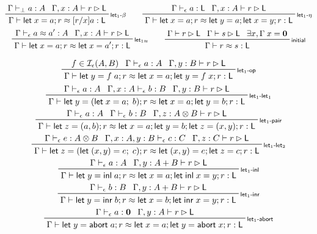 \documentclass[acmsmall,screen,review]{acmart}
\newcommand{\mc}[1]{\ensuremath{\mathcal{#1}}}
\newcommand{\mb}[1]{\ensuremath{\mathbf{#1}}}
\newcommand{\ms}[1]{\ensuremath{\mathsf{#1}}}
\newcommand{\linl}[1]{\ms{inl}\;{#1}}
\newcommand{\linr}[1]{\ms{inr}\;{#1}}
\newcommand{\labort}[1]{\ms{abort}\;{#1}}
\newcommand{\letexpr}[3]{\ensuremath{\ms{let}\;#1 = #2;\;#3}}
\newcommand{\letstmt}[3]{\ensuremath{\ms{let}\;#1 = #2; #3}}
\newcommand{\bhyp}[2]{#1 : #2}
\newcommand{\rle}[1]{{\scriptsize\textsf{#1}}}
\newcommand{\hasty}[4]{#1 \vdash_{#2} #3: {#4}}
\newcommand{\haslb}[3]{#1 \vdash #2 \rhd #3}
\newcommand{\isop}[4]{#1 \in \mc{I}_{#4}(#2, #3)}
\newcommand{\teqv}{\approx}
\newcommand{\tmeq}[5]{#1 \vdash_{#2} #3 \teqv #4 : {#5}}
\newcommand{\lbeq}[4]{#1 \vdash #2 \teqv #3 : {#4}}
\begin{document}
\begin{gather*}
  \prftree[r]{\rle{let$_1$-$\beta$}}
    {\hasty{\Gamma}{\bot}{a}{A}}
    {\haslb{\Gamma, \bhyp{x}{A}}{r}{\ms{L}}}
    {\lbeq{\Gamma}{\letstmt{x}{a}{r}}{[r/x]a}{\ms{L}}}
  \qquad
  \prftree[r]{\rle{let$_1$-$\eta$}}
    {\hasty{\Gamma}{\epsilon}{a}{\ms{L}}}
    {\haslb{\Gamma, \bhyp{x}{A}}{r}{\ms{L}}}
    {\lbeq{\Gamma}{\letstmt{x}{a}{r}}{\letstmt{y}{a}{\letstmt{x}{y}{r}}}{\ms{L}}}
  \\
  \prftree[r]{\rle{let$_{1\approx}$}}
    {\tmeq{\Gamma}{\epsilon}{a}{a'}{A}}
    {\haslb{\Gamma, \bhyp{x}{A}}{r}{\ms{L}}}
    {\lbeq{\Gamma}{\letstmt{x}{a}{r}}{\letstmt{x}{a'}{r}}{\ms{L}}}
  \qquad
  \prftree[r]{\rle{initial}}
    {\haslb{\Gamma}{r}{\ms{L}}}
    {\haslb{\Gamma}{s}{\ms{L}}}
    {\exists x, \Gamma\;x = \mb{0}}
    {\lbeq{\Gamma}{r}{s}{\ms{L}}}
\end{gather*}

\begin{gather*}
  \prftree[r]{\rle{let$_1$-op}}
    {\isop{f}{A}{B}{\epsilon}}
    {\hasty{\Gamma}{\epsilon}{a}{A}}
    {\haslb{\Gamma, \bhyp{y}{B}}{r}{\ms{L}}}
    {\lbeq{\Gamma}{\letstmt{y}{f\;a}{r}}{\letstmt{x}{a}{\letstmt{y}{f\;x}{r}}}{\ms{L}}}
  \\
  \prftree[r]{\rle{let$_{1}$-let$_1$}}
    {\hasty{\Gamma}{\epsilon}{a}{A}}
    {\hasty{\Gamma, \bhyp{x}{A}}{\epsilon}{b}{B}}
    {\haslb{\Gamma, \bhyp{y}{B}}{r}{\ms{L}}}
    {\lbeq{\Gamma}{\letstmt{y}{(\letexpr{x}{a}{b})}{r}}{\letstmt{x}{a}{\letstmt{y}{b}{r}}}{\ms{L}}}
  \\
  \prftree[r]{\rle{let$_1$-pair}}
    {\hasty{\Gamma}{\epsilon}{a}{A}}
    {\hasty{\Gamma}{\epsilon}{b}{B}}
    {\haslb{\Gamma, \bhyp{z}{A \otimes B}}{r}{\ms{L}}}
    {\lbeq{\Gamma}
      {\letstmt{z}{(a, b)}{r}}
      {\letstmt{x}{a}{\letstmt{y}{b}{\letstmt{z}{(x, y)}{r}}}}
      {\ms{L}}}
  \\
  \prftree[r]{\rle{let$_{1}$-let$_2$}}
    {\hasty{\Gamma}{\epsilon}{e}{A \otimes B}}
    {\hasty{\Gamma, \bhyp{x}{A}, \bhyp{y}{B}}{\epsilon}{c}{C}}
    {\haslb{\Gamma, \bhyp{z}{C}}{r}{\ms{L}}}
    {\lbeq{\Gamma}
      {\letstmt{z}{(\letexpr{(x, y)}{e}{c})}{r}}
      {\letstmt{(x, y)}{e}{\letstmt{z}{c}{r}}}
      {\ms{L}}}
  \\
  \prftree[r]{\rle{let$_1$-inl}}
    {\hasty{\Gamma}{\epsilon}{a}{A}}
    {\haslb{\Gamma, \bhyp{y}{A + B}}{r}{\ms{L}}}
    {\lbeq{\Gamma}{\letstmt{y}{\linl{a}}{r}}{\letstmt{x}{a}{\letstmt{\linl{x}}{y}{r}}}{\ms{L}}}
  \\
  \prftree[r]{\rle{let$_1$-inr}}
    {\hasty{\Gamma}{\epsilon}{b}{B}}
    {\haslb{\Gamma, \bhyp{y}{A + B}}{r}{\ms{L}}}
    {\lbeq{\Gamma}{\letstmt{y}{\linr{b}}{r}}{\letstmt{x}{b}{\letstmt{\linr{x}}{y}{r}}}{\ms{L}}}
  \\
  \prftree[r]{\rle{let$_1$-abort}}
    {\hasty{\Gamma}{\epsilon}{a}{\mb{0}}}
    {\haslb{\Gamma, \bhyp{y}{A}}{r}{\ms{L}}}
    {\lbeq{\Gamma}{\letstmt{y}{\labort{a}}{r}}{\letstmt{x}{a}{\letstmt{y}{\labort{x}}{r}}}{\ms{L}}}
\end{gather*}
\end{document}
